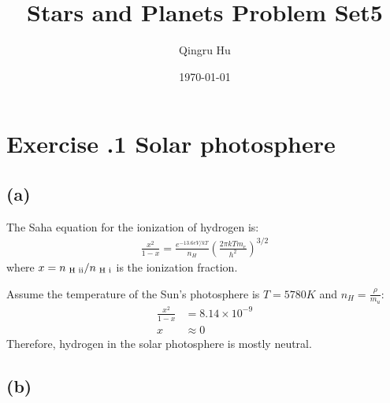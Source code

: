 \documentclass[a4paper,12pt]{article}
\title{\textbf{Stars and Planets Problem Set5}}
\author{Qingru Hu}
\date{\today}
\newcommand{\cm}{\mathrm{cm}}
\newcommand{\g}{\mathrm{g}}
\begin{document}
\maketitle
\section*{\textbf{Exercise \uppercase\expandafter{}.1 Solar photosphere}}
\subsection*{(a)}
The Saha equation for the ionization of hydrogen is:
\begin{align*}
    \frac{x^2}{1-x} = \frac{e^{-13.6eV/kT}}{n_H} (\frac{2\pi kT m_e}{h^2})^{3/2}
\end{align*}
where $x = n_{\text{ H \uppercase\expandafter{\romannumeral2}}} / n_{\text{ H \uppercase\expandafter{\romannumeral1}}}$ is 
the ionization fraction.

Assume the temperature of the Sun's photosphere is $T=5780K$ and $n_H = \frac{\rho}{m_u}$:
\begin{align*}
    \frac{x^2}{1-x} &= 8.14 \times 10^{-9} \\
    x & \approx 0
\end{align*}
Therefore, hydrogen in the solar photosphere is mostly neutral.

\subsection*{(b)}


\end{document}
